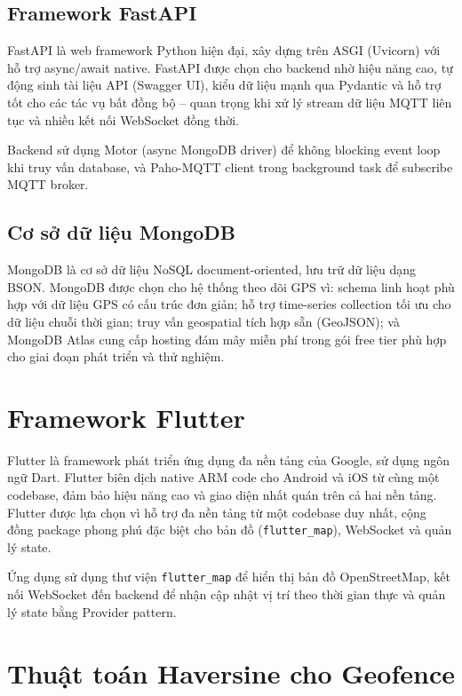 \documentclass[../DoAn.tex]{subfiles}
\begin{document}
\subsection{Framework FastAPI}

FastAPI là web framework Python hiện đại, xây dựng trên ASGI (Uvicorn) với hỗ trợ async/await native. FastAPI được chọn cho backend nhờ hiệu năng cao, tự động sinh tài liệu API (Swagger UI), kiểu dữ liệu mạnh qua Pydantic và hỗ trợ tốt cho các tác vụ bất đồng bộ -- quan trọng khi xử lý stream dữ liệu MQTT liên tục và nhiều kết nối WebSocket đồng thời.

Backend sử dụng Motor (async MongoDB driver) để không blocking event loop khi truy vấn database, và Paho-MQTT client trong background task để subscribe MQTT broker.

\subsection{Cơ sở dữ liệu MongoDB}

MongoDB là cơ sở dữ liệu NoSQL document-oriented, lưu trữ dữ liệu dạng BSON. MongoDB được chọn cho hệ thống theo dõi GPS vì: schema linh hoạt phù hợp với dữ liệu GPS có cấu trúc đơn giản; hỗ trợ time-series collection tối ưu cho dữ liệu chuỗi thời gian; truy vấn geospatial tích hợp sẵn (GeoJSON); và MongoDB Atlas cung cấp hosting đám mây miễn phí trong gói free tier phù hợp cho giai đoạn phát triển và thử nghiệm.

\section{Framework Flutter}

Flutter là framework phát triển ứng dụng đa nền tảng của Google, sử dụng ngôn ngữ Dart. Flutter biên dịch native ARM code cho Android và iOS từ cùng một codebase, đảm bảo hiệu năng cao và giao diện nhất quán trên cả hai nền tảng. Flutter được lựa chọn vì hỗ trợ đa nền tảng từ một codebase duy nhất, cộng đồng package phong phú đặc biệt cho bản đồ (\texttt{flutter\_map}), WebSocket và quản lý state.

Ứng dụng sử dụng thư viện \texttt{flutter\_map} để hiển thị bản đồ OpenStreetMap, kết nối WebSocket đến backend để nhận cập nhật vị trí theo thời gian thực và quản lý state bằng Provider pattern.

\section{Thuật toán Haversine cho Geofence}
\end{document}
